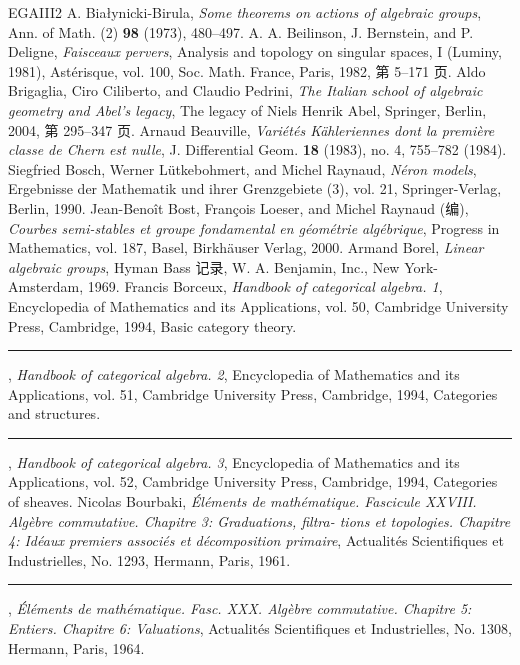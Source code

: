 \begin{thebibliography}{EGAIII2}
 A. Białynicki-Birula, \emph{Some theorems on actions of algebraic groups}, Ann. of Math. (2) \textbf{98} (1973), 480--497.
 A. A. Beilinson, J. Bernstein, and P. Deligne, \emph{Faisceaux pervers}, Analysis and topology on singular spaces, I (Luminy, 1981), Astérisque, vol. 100, Soc. Math. France, Paris, 1982, 第 5--171 页.
 Aldo Brigaglia, Ciro Ciliberto, and Claudio Pedrini, \emph{The Italian school of algebraic geometry and Abel's legacy}, The legacy of Niels Henrik Abel, Springer, Berlin, 2004, 第 295--347 页.
 Arnaud Beauville, \emph{Variétés Kähleriennes dont la première classe de Chern est nulle}, J. Differential Geom. \textbf{18} (1983), no. 4, 755--782 (1984).
 Siegfried Bosch, Werner Lütkebohmert, and Michel Raynaud, \emph{Néron models}, Ergebnisse der Mathematik und ihrer Grenzgebiete (3), vol. 21, Springer-Verlag, Berlin, 1990.
 Jean-Benoît Bost, François Loeser, and Michel Raynaud (编), \emph{Courbes semi-stables et groupe fondamental en géométrie algébrique}, Progress in Mathematics, vol. 187, Basel, Birkhäuser Verlag, 2000.
 Armand Borel, \emph{Linear algebraic groups}, Hyman Bass 记录, W. A. Benjamin, Inc., New York-Amsterdam, 1969.
 Francis Borceux, \emph{Handbook of categorical algebra. 1}, Encyclopedia of Mathematics and its Applications, vol. 50, Cambridge University Press, Cambridge, 1994, Basic category theory.
 \rule{2em}{.3pt}, \emph{Handbook of categorical algebra. 2}, Encyclopedia of Mathematics and its Applications, vol. 51, Cambridge University Press, Cambridge, 1994, Categories and structures.
 \rule{2em}{.3pt}, \emph{Handbook of categorical algebra. 3}, Encyclopedia of Mathematics and its Applications, vol. 52, Cambridge University Press, Cambridge, 1994, Categories of sheaves.
 Nicolas Bourbaki, \emph{Éléments de mathématique. Fascicule XXVIII. Algèbre commutative. Chapitre 3: Graduations, filtra- tions et topologies. Chapitre 4: Idéaux premiers associés et décomposition primaire}, Actualités Scientifiques et Industrielles, No. 1293, Hermann, Paris, 1961.
 \rule{2em}{.3pt}, \emph{Éléments de mathématique. Fasc. XXX. Algèbre commutative. Chapitre 5: Entiers. Chapitre 6: Valuations}, Actualités Scientifiques et Industrielles, No. 1308, Hermann, Paris, 1964.

\end{thebibliography}

